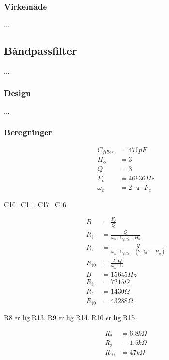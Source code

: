 \subsubsection{Virkemåde}

...

\subsection{Båndpassfilter}
...

\subsubsection{Design}
...

\subsubsection{Beregninger}

\begin{equation}
\label{eq:FilterParametre}
\begin{split}
C_{filter} & = 470pF\\
H_o & = 3\\
Q & = 3\\
F_c & = 46936Hz \\
\omega_c & = 2 \cdot \pi \cdot F_c
\end{split}
\end{equation}

C10=C11=C17=C16

\begin{equation}
\label{eq:FilterModstandeBW}
\begin{split}
B & = \frac{F_c}{Q} \\
R_8 & = \frac{Q}{\omega_n \cdot C_{filter} \cdot H_o } \\
R_9 & = \frac{Q}{ \omega_n \cdot C_{filter} \cdot \left( 2 \cdot Q^2 - H_o \right) } \\
R_{10} & = \frac{2 \cdot Q}{ \omega_n \cdot C} \\
B & = 15645Hz \\
R_8 & = 7215 \Omega \\
R_9 & = 1430 \Omega \\
R_{10} & = 43288 \Omega
\end{split}
\end{equation}

R8 er lig R13. R9 er lig R14. R10 er lig R15.

\begin{equation}
\label{eq:FilterModstandeTilnaermelse}
\begin{split}
R_8 & = 6.8k \Omega \\
R_9 & = 1.5k \Omega \\
R_{10} & = 47k \Omega
\end{split}
\end{equation}

